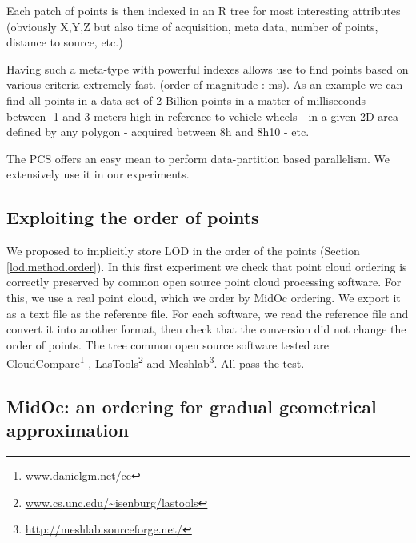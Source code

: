 		Each patch of points is then indexed in an R tree for most interesting attributes (obviously X,Y,Z but also time of acquisition, meta data, number of points, distance to source, etc.)
			
		Having such a meta-type with powerful indexes allows use to find points based on various criteria extremely fast. (order of magnitude : ms). 
		As an example we can find all points in a data set of 2 Billion points in a matter of milliseconds 
		 - between -1 and 3 meters high in reference to vehicle wheels
		 - in a given 2D area defined by any polygon 
		 - acquired between 8h and 8h10 - etc.
		 
		The PCS offers an easy mean to perform data-partition based parallelism. We extensively use it in our experiments. 


	\subsection{Exploiting the order of points}
		\label{lod.result.os_softwares}
		We proposed to implicitly store LOD in the order of the points (Section \ref{lod.method.order}).
		In this first experiment we check that point cloud ordering is correctly preserved by common open source point cloud processing software.
		For this, we use a real point cloud, which we order by MidOc ordering. 
		We export it as a text file as the reference file.
		For each software, we read the reference file and convert it into another format, then check that the conversion did not change the order of points. 
		The tree common open source software tested are CloudCompare\footnote{\url{www.danielgm.net/cc}}
		, LasTools\footnote{\url{www.cs.unc.edu/~isenburg/lastools}} and Meshlab\footnote{\url{http://meshlab.sourceforge.net/}}.
		All pass the test.
			
	\subsection{MidOc: an ordering for gradual geometrical approximation}
		
